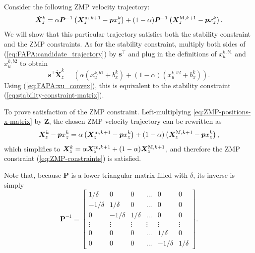 Consider the following ZMP velocity trajectory:
\begin{equation}\label{eq:FAPA:candidate_trajectory}
\dot{\bm{X}}_z^k = \alpha \bm{P}^{-1}\left(\bm{X}_z^{{\rm m}, k+1} - \bm{p} x_z^k\right) + (1-\alpha)\bm{P}^{-1}\left(\bm{X}_z^{{\rm M}, k+1} - \bm{p} x_z^k\right).
\end{equation}
We will show that this particular trajectory satisfies both the stability
constraint and the ZMP constraints. As for the stability constraint, multiply
both sides of (\ref{eq:FAPA:candidate_trajectory}) by $\bm{s}^\top$
and plug in the definitions of $x_u^{k,b1}$ and $x_u^{k,b2}$ to obtain
\begin{equation*}
\bm{s}^\top\dot{\bm X}_z^k = \left(\alpha \left(x_u^{k,b1} + b^k_x\right) + (1-\alpha)\left(x_u^{k,b2} + b^k_x\right)\right).
\end{equation*}
Using (\ref{eq:FAPA:xu_convex}), this is equivalent to the stability
constraint (\ref{eq:stability-constraint-matrix}).

To prove satisfaction of the ZMP constraint. Left-multiplying
\eqref{eq:ZMP-positions-x-matrix} by $\bm{Z}$, the chosen ZMP velocity
trajectory can be rewritten as
\begin{equation*}
\bm{X}_z^k - \bm{p} x_z^k = \alpha \left(\bm{X}_z^{{\rm m}, k+1} - \bm{p} x_z^k\right) + (1-\alpha)\left(\bm{X}_z^{{\rm M}, k+1} - \bm{p} x_z^k\right),
\end{equation*}
which simplifies to
$\bm{X}_z^k = \alpha \bm{X}_z^{{\rm m}, k+1} + (1-\alpha)\bm{X}_z^{{\rm M}, k+1}$,
and therefore the ZMP constraint (\ref{eq:ZMP-constraints}) is satisfied.
\hfill\bull

Note that, because $\bm{P}$ is a lower-triangular matrix filled with $\delta$,
its inverse is simply
\begin{equation*}
    \bm{P}^{-1}
    =
    \begin{bmatrix}
         1/\delta &         0 &        0 &  \dots &         0 &        0 \\
        -1/\delta &  1/\delta &        0 &  \dots &         0 &        0 \\
                0 & -1/\delta & 1/\delta &  \dots &         0 &        0 \\
           \vdots &    \vdots &   \vdots & \vdots &    \vdots &   \vdots \\
                0 &         0 &        0 &  \dots &  1/\delta &        0 \\
                0 &         0 &        0 &  \dots & -1/\delta & 1/\delta
    \end{bmatrix}.
\end{equation*}
